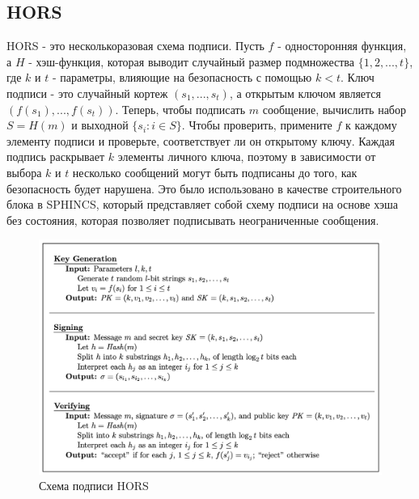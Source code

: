 \documentclass[a4paper, 14pt]{extarticle}
\begin{document}
\subsection{HORS}
HORS - это несколькоразовая схема подписи. Пусть $f$ - односторонняя функция, а $H$ - хэш-функция, которая выводит случайный размер подмножества $\{1,2,...,t\}$, где $k$ и $t$ - параметры, влияющие на безопасность с помощью $k < t$. Ключ подписи - это случайный кортеж $(s_1,...,s_t)$, а открытым ключом является $(f(s_{1}),..., f(s_{t}))$. 
Теперь, чтобы подписать $m$ сообщение, вычислить набор $S = H(m)$ и выходной $\{s_{i} : i \in S\}$. Чтобы проверить, примените $f$ к каждому элементу подписи и проверьте, соответствует ли он открытому ключу. Каждая подпись раскрывает $k$ элементы личного ключа, поэтому в зависимости от выбора $k$ и $t$ несколько сообщений могут быть подписаны до того, как безопасность будет нарушена. Это было использовано в качестве строительного блока в SPHINCS, который представляет собой схему подписи на основе хэша без состояния, которая позволяет подписывать неограниченные сообщения.

\begin{figure}[h]
    \centering
    \includegraphics[scale=0.66]{HORS.png}
    \caption{Схема подписи HORS}
    \label{fig:hors}
\end{figure}
\end{document}
